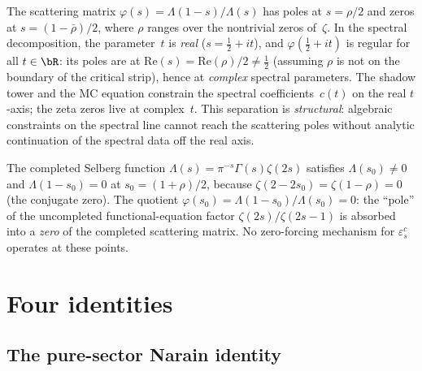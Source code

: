 \begin{remark}
\label{rem:structural-obstruction}
The scattering matrix $\varphi(s)=\Lambda(1{-}s)/\Lambda(s)$ has
poles at $s=\rho/2$ and zeros at $s=(1{-}\bar\rho)/2$, where $\rho$
ranges over the nontrivial zeros of~$\zeta$. In the spectral
decomposition, the parameter~$t$ is
\emph{real} ($s=\tfrac12+it$), and $\varphi(\tfrac12+it)$
is regular for all $t\in\bR$: its poles are at
$\mathrm{Re}(s)=\mathrm{Re}(\rho)/2\ne\tfrac12$
(assuming $\rho$ is not on the boundary of the critical strip),
hence at \emph{complex} spectral parameters. The shadow tower and
the MC equation constrain the spectral coefficients~$c(t)$ on the
real $t$-axis; the zeta zeros live at complex~$t$. This separation
is \emph{structural}: algebraic constraints on the spectral line
cannot reach the scattering poles without analytic continuation of
the spectral data off the real axis.

The completed Selberg function $\Lambda(s)=\pi^{-s}\Gamma(s)\zeta(2s)$
satisfies $\Lambda(s_0)\ne 0$ and $\Lambda(1{-}s_0)=0$ at
$s_0=(1{+}\rho)/2$, because $\zeta(2{-}2s_0)=\zeta(1{-}\rho)=0$
(the conjugate zero). The quotient
$\varphi(s_0)=\Lambda(1{-}s_0)/\Lambda(s_0)=0$: the ``pole'' of
the uncompleted functional-equation factor
$\zeta(2s)/\zeta(2s{-}1)$ is absorbed into a
\emph{zero} of the completed scattering matrix. No zero-forcing
mechanism for $\varepsilon^c_s$ operates at these points.
\end{remark}

\section{Four identities}\label{sec:four-identities}

\subsection{The pure-sector Narain identity}

